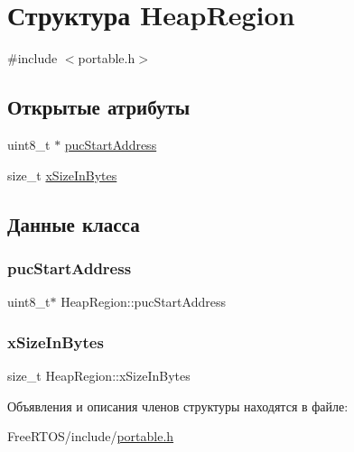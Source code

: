 \hypertarget{struct_heap_region}{}\section{Структура Heap\+Region}
\label{struct_heap_region}


{\ttfamily \#include $<$portable.\+h$>$}

\subsection*{Открытые атрибуты}
\begin{DoxyCompactItemize}
\item 
uint8\+\_\+t $\ast$ \mbox{\hyperlink{struct_heap_region_aab323508c34642ebfb884a68441d97fc}{puc\+Start\+Address}}
\item 
size\+\_\+t \mbox{\hyperlink{struct_heap_region_a5933b0fd422e70a92ceef839b89a757f}{x\+Size\+In\+Bytes}}
\end{DoxyCompactItemize}


\subsection{Данные класса}
\mbox{\label{struct_heap_region_aab323508c34642ebfb884a68441d97fc}} 
\subsubsection{\texorpdfstring{pucStartAddress}{pucStartAddress}}
{\footnotesize\ttfamily uint8\+\_\+t$\ast$ Heap\+Region\+::puc\+Start\+Address}

\mbox{\label{struct_heap_region_a5933b0fd422e70a92ceef839b89a757f}} 
\subsubsection{\texorpdfstring{xSizeInBytes}{xSizeInBytes}}
{\footnotesize\ttfamily size\+\_\+t Heap\+Region\+::x\+Size\+In\+Bytes}



Объявления и описания членов структуры находятся в файле\+:\begin{DoxyCompactItemize}
\item 
Free\+R\+T\+O\+S/include/\mbox{\hyperlink{portable_8h}{portable.\+h}}\end{DoxyCompactItemize}
